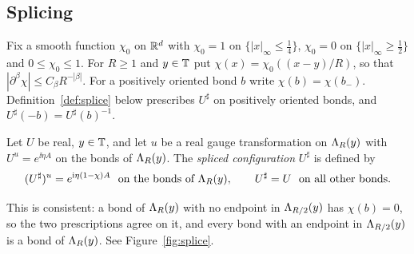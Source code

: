 \subsection{Splicing}

Fix a smooth function $\chi_0$ on $\mathbb R^d$ with $\chi_0=1$ on $\{|x|_\infty\le\frac14\}$, $\chi_0=0$ on $\{|x|_\infty\ge\frac12\}$ and $0\le\chi_0\le1$. For $R\ge1$ and $y\in\mathbb T$ put $\chi(x)=\chi_0((x-y)/R)$, so that $|\partial^\beta\chi|\le C_\beta R^{-|\beta|}$. For a positively oriented bond $b$ write $\chi(b)=\chi(b_-)$. Definition~\ref{def:splice} below prescribes $U^\sharp$ on positively oriented bonds, and $U^\sharp(-b)=U^\sharp(b)^{-1}$.

\begin{definition}\label{def:splice}
Let $U$ be real, $y\in\mathbb T$, and let $u$ be a real gauge transformation on $\Lambda_R(y)$ with $U^u=e^{\ii\eta A}$ on the bonds of $\Lambda_R(y)$. The \emph{spliced configuration} $U^\sharp$ is defined by
\[
(U^\sharp)^u=e^{\mathrm i\eta(1-\chi)A}\ \text{ on the bonds of }\Lambda_R(y),\qquad U^\sharp=U\ \text{ on all other bonds.}
\]
\end{definition}

This is consistent: a bond of $\Lambda_R(y)$ with no endpoint in $\Lambda_{R/2}(y)$ has $\chi(b)=0$, so the two prescriptions agree on it, and every bond with an endpoint in $\Lambda_{R/2}(y)$ is a bond of $\Lambda_R(y)$. See Figure~\ref{fig:splice}.

